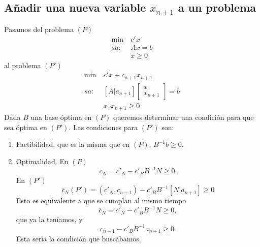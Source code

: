 \documentclass[PM.tex]{subfiles}
\begin{document}
\subsection{Añadir una nueva variable $x_{n+1}$ a un problema}
Pasamos del problema $(P)$
\begin{align*}
\min\ & c'x\\
sa:\ & Ax=b\\
 & x\geq 0
\end{align*}
al problema $(P')$
\begin{align*}
\min\ & c'x+c_{n+1}x_{n+1}\\
sa:\ & [A|a_{n+1}]\begin{bmatrix}
x\\
x_{n+1}
\end{bmatrix}=b\\
 &  x,x_{n+1}\geq 0
\end{align*}
Dada $B$ una base óptima en $(P)$ queremos determinar una condición para que sea óptima en $(P')$. Las condiciones para $(P')$ son:
\begin{enumerate}
\item Factibilidad, que es la misma que en $(P)$, $B^{-1}b\geq 0$. 
\item Optimalidad. En $(P)$ \[\overline{c}_N=c'_N-c'_B B^{-1}N\geq 0.\]
En $(P')$
\[\overline{c}_N(P')=(c'_N, c_{n+1})-c'_B B^{-1}[N| a_{n+1}]\geq 0\]
Esto es equivalente a que se cumplan al mismo tiempo
\[\overline{c}_N=c'_N-c'_B B^{-1}N\geq 0,\]
que ya la teníamos, y 
\[c_{n+1}-c'_B B^{-1} a_{n+1}\geq 0.\] Esta sería la condición que buscábamos.

\end{enumerate}
\end{document}
